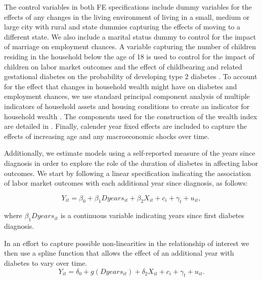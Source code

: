 \documentclass[12pt,english,british]{article}
\begin{document}
The control variables in both \ac{FE} specifications include dummy variables for the effects of any changes in the living environment
of living in a small, medium or large city with rural and state
dummies capturing the effects of moving to a different state. We also include a marital
status dummy to control for the impact of marriage on employment chances.
A variable capturing the number of children residing in the household
below the age of 18 is used to control for the impact of children
on labor market outcomes and the effect of childbearing and related
gestational diabetes on the probability of developing type 2 diabetes
\citep{Bellamy2009}. To account for the effect that changes in household
wealth might have on diabetes and employment chances, we use standard
principal component analysis of multiple indicators of household assets
and housing conditions to create an indicator for household wealth
\citep{Filmer2001}. The components used for the construction of the
wealth index are detailed in \citet{Seuring2015}. Finally, calender year fixed effects are included to capture the effects of increasing age and any macroeconomic shocks over time.

Additionally, we estimate models using a self-reported
measure of the years since diagnosis in order to explore the role of the duration of diabetes in affecting labor outcomes. We start by following a linear specification
indicating the association of labor market outcomes with each additional
year since diagnosis, as follows:

\begin{equation}
Y_{it}=\beta_{0}+\beta_{1}Dyears_{it}+\beta_{2}X_{it}+c_{i}+\gamma_{t}+u_{it},\label{eq:duration_linear}
\end{equation}


\noindent where $\beta_{1}Dyears_{it}$ is a continuous variable indicating
years since first diabetes diagnosis.

In an effort to capture possible non-linearities in the relationship of interest we then use a spline function that allows the effect
of an additional year with diabetes to vary over time.
\begin{equation}
Y_{it}=\delta_{0}+g(Dyears_{it})+\delta_{2}X_{it}+c_{i}+\gamma_{t}+u_{it}.\label{eq:splines}
\end{equation}
\end{document}
